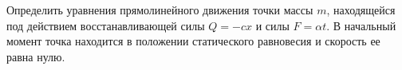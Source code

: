 Определить уравнения прямолинейного движения точки массы $m$, находящейся
под действием восстанавливающей силы $Q=-cx$ и силы $F=\alpha t$. В начальный
момент точка находится в положении статического равновесия и скорость ее
равна нулю.
